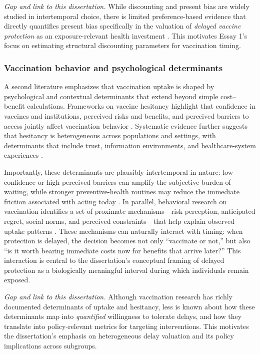 \documentclass[doublespacing]{utdthesis}
\let\cite=\citep
\begin{document}
\textit{Gap and link to this dissertation.} While discounting and present bias are widely studied in intertemporal choice, there is limited preference-based evidence that directly quantifies present bias specifically in the valuation of \emph{delayed vaccine protection} as an exposure-relevant health investment \cite{Frederick2002, Laibson1997, Attema2018}. This motivates Essay 1’s focus on estimating structural discounting parameters for vaccination timing.

\subsubsection{Vaccination behavior and psychological determinants}

A second literature emphasizes that vaccination uptake is shaped by psychological and contextual determinants that extend beyond simple cost–benefit calculations. Frameworks on vaccine hesitancy highlight that confidence in vaccines and institutions, perceived risks and benefits, and perceived barriers to access jointly affect vaccination behavior \cite{MacDonald2015_SAGE, Brewer2017}. Systematic evidence further suggests that hesitancy is heterogeneous across populations and settings, with determinants that include trust, information environments, and healthcare-system experiences \cite{Larson2014, Callaghan2021_SSM}.

Importantly, these determinants are plausibly intertemporal in nature: low confidence or high perceived barriers can amplify the subjective burden of waiting, while stronger preventive-health routines may reduce the immediate friction associated with acting today \cite{Milkman2021_PNAS}. In parallel, behavioral research on vaccination identifies a set of proximate mechanisms—risk perception, anticipated regret, social norms, and perceived constraints—that help explain observed uptake patterns \cite{Brewer2017, Betsch2018_PLOS}. These mechanisms can naturally interact with timing: when protection is delayed, the decision becomes not only “vaccinate or not,” but also “is it worth bearing immediate costs now for benefits that arrive later?” This interaction is central to the dissertation’s conceptual framing of delayed protection as a biologically meaningful interval during which individuals remain exposed.

\textit{Gap and link to this dissertation.} Although vaccination research has richly documented determinants of uptake and hesitancy, less is known about how these determinants map into \emph{quantified} willingness to tolerate delays, and how they translate into policy-relevant metrics for targeting interventions. This motivates the dissertation’s emphasis on heterogeneous delay valuation and its policy implications across subgroups.
\end{document}
